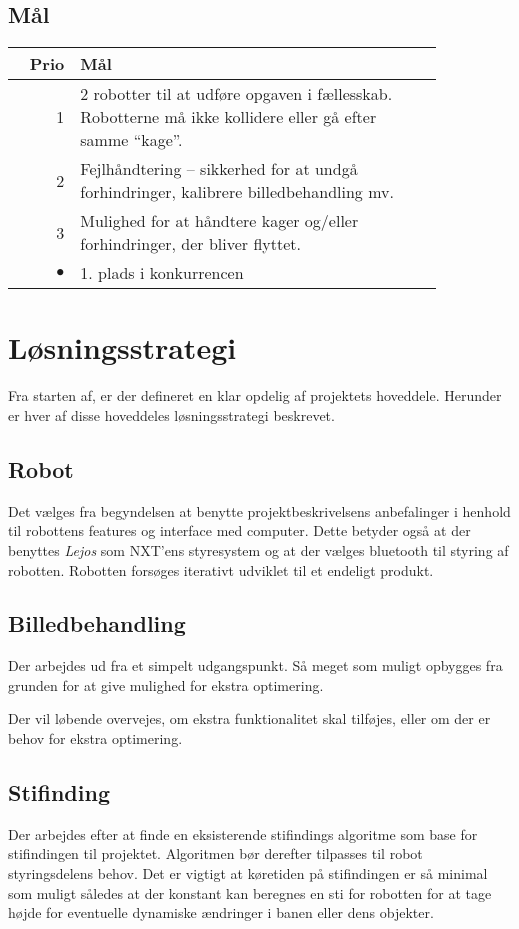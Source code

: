 \subsection{Mål}
\begin{tabular}{r p{0.85\linewidth}}
	\textbf{Prio} & \textbf{Mål} \\
	\hline
	1 & 2 robotter til at udføre opgaven i fællesskab. Robotterne må ikke kollidere eller gå efter samme "`kage"'.\\
	2 & Fejlhåndtering -- sikkerhed for at undgå forhindringer, kalibrere billedbehandling mv.\\
	3 & Mulighed for at håndtere kager og/eller forhindringer, der bliver flyttet. \\
	$\bullet$ & 1. plads i konkurrencen
\end{tabular}

\section{Løsningsstrategi}
Fra starten af, er der defineret en klar opdelig af projektets hoveddele. Herunder er hver af disse hoveddeles løsningsstrategi beskrevet.

\subsection{Robot}
Det vælges fra begyndelsen at benytte projektbeskrivelsens anbefalinger i henhold til robottens features og interface med computer.
Dette betyder også at der benyttes \textit{Lejos} som NXT'ens styresystem og at der vælges bluetooth til styring af robotten.
Robotten forsøges iterativt udviklet til et endeligt produkt.

\subsection{Billedbehandling}
Der arbejdes ud fra et simpelt udgangspunkt. Så meget som muligt opbygges fra grunden for at give mulighed for ekstra optimering.

Der vil løbende overvejes, om ekstra funktionalitet skal tilføjes, eller om der er behov for ekstra optimering.

\subsection{Stifinding}
Der arbejdes efter at finde en eksisterende stifindings algoritme som base for stifindingen til projektet. Algoritmen bør derefter tilpasses til robot styringsdelens behov.
Det er vigtigt at køretiden på stifindingen er så minimal som muligt således at der konstant kan beregnes en sti for robotten for at tage højde for eventuelle dynamiske ændringer i banen eller dens objekter.